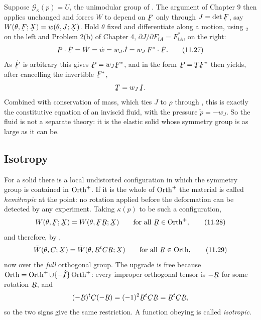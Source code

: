 Suppose $\mathcal{G}_{\kappa}(p)=U$, the unimodular group of
. The argument of Chapter 9 then applies unchanged and forces
$W$ to depend on $\bF$ only through $J=\det\bF$, say
$W(\theta,\bF;\bX)=w(\theta,J;\bX)$. Hold $\theta$ fixed and
differentiate along a motion, using $_{2}$ on the left and
Problem 2(b) of Chapter 4, $\partial J/\partial F_{iA}=F^{*}_{iA}$, on
the right:
\begin{equation}
   \bP\cdot\dot\bF=\dot W=\dot w=w_{J}\dot J
   =w_{J}\,\bF^{*}\cdot\dot\bF .
   \tag{11.27}\label{eq:11.27}
\end{equation}
As $\dot\bF$ is arbitrary this gives $\bP=w_{J}\bF^{*}$, and 
in the form $\bP=\bT\bF^{*}$ then yields, after cancelling the
invertible $\bF^{*}$,
\[
   \bT=w_{J}\,\I .
\]
Combined with conservation of mass, which ties $J$ to $\rho$ through
, this is exactly the constitutive equation  of an
inviscid fluid, with the pressure $\tilde p=-w_{J}$. So the fluid is not
a separate theory: it is the elastic solid whose symmetry group is as
large as it can be.

\subsection*{Isotropy}

For a solid there is a local undistorted configuration in which the
symmetry group is contained in $\operatorname{Orth}^{+}$. If it is the whole of
$\operatorname{Orth}^{+}$ the material is called \emph{hemitropic} at the point: no
rotation applied before the deformation can be detected by any
experiment. Taking $\kappa(p)$ to be such a configuration,
\begin{equation}
   W(\theta,\bF;\bX)=W(\theta,\bF\bR;\bX)
   \qquad\text{for all }\bR\in\Orth^{+},
   \tag{11.28}\label{eq:11.28}
\end{equation}
and therefore, by ,
\begin{equation}
   \bar W(\theta,\bC;\bX)=\bar W(\theta,\bR^{t}\bC\bR;\bX)
   \qquad\text{for all }\bR\in\Orth ,
   \tag{11.29}\label{eq:11.29}
\end{equation}
now over the \emph{full} orthogonal group. The upgrade is free because
$\Orth=\Orth^{+}\cup\{-\hI\}\Orth^{+}$: every improper orthogonal tensor
is $-\bR$ for some rotation $\bR$, and
\[
   (-\bR)^{t}\bC(-\bR)=(-1)^{2}\bR^{t}\bC\bR=\bR^{t}\bC\bR ,
\]
so the two signs give the same restriction. A function obeying
 is called \emph{isotropic}.


